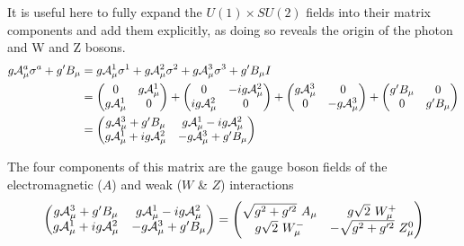     It is useful here to fully expand the $U(1) \times SU(2)$ fields into their matrix components and add them explicitly,
        as doing so reveals the origin of the photon and W and Z bosons.
    \begin{equation} \begin{split}
        g \mathcal{A}^a_{\mu} \sigma^a + g' B_{\mu} & =
            g \mathcal{A}^1_{\mu} \sigma^1
            + g \mathcal{A}^2_{\mu} \sigma^2
            + g \mathcal{A}^3_{\mu} \sigma^3
            + g' B_{\mu} I \\
        & = \begin{pmatrix}
            0 & g\mathcal{A}^1_{\mu} \\ g\mathcal{A}^1_{\mu} & 0 \end{pmatrix}
            + \begin{pmatrix} 0 & -ig\mathcal{A}^2_{\mu} \\ ig\mathcal{A}^2_{\mu} & 0 \end{pmatrix}
            + \begin{pmatrix} g\mathcal{A}^3_{\mu} & 0 \\ 0 & -g\mathcal{A}^3_{\mu} \end{pmatrix}
            + \begin{pmatrix} g'B_{\mu} & 0 \\ 0 & g'B_{\mu}
        \end{pmatrix} \\
        & = \begin{pmatrix} 
            g\mathcal{A}^3_{\mu} + g'B_{\mu} & g\mathcal{A}^1_{\mu} - ig\mathcal{A}^2_{\mu} \\
            g\mathcal{A}^1_{\mu} + ig\mathcal{A}^2_{\mu} & -g\mathcal{A}^3_{\mu} + g'B_{\mu}
        \end{pmatrix}
    \end{split} \end{equation}

    The four components of this matrix are the gauge boson fields of the electromagnetic ($A$) and weak ($W$ \& $Z$) interactions
    \begin{equation} \begin{split}
        \label{eq:electroweak_matrix}
        \begin{pmatrix} 
            g\wField^3_{\mu} + g'B_{\mu} & g\wField^1_{\mu} - ig\wField^2_{\mu} \\
            g\wField^1_{\mu} + ig\wField^2_{\mu} & -g\wField^3_{\mu} + g'B_{\mu}
        \end{pmatrix} =
        \begin{pmatrix} 
            \sqrt{g^2 + g^{\prime 2}}\ A_{\mu} & g \sqrt{2}\ W^+_{\mu} \\
            g \sqrt{2}\ W^-_{\mu} & - \sqrt{g^2 + g^{\prime 2}}\ Z^0_{\mu}
        \end{pmatrix}
    \end{split} \end{equation}

